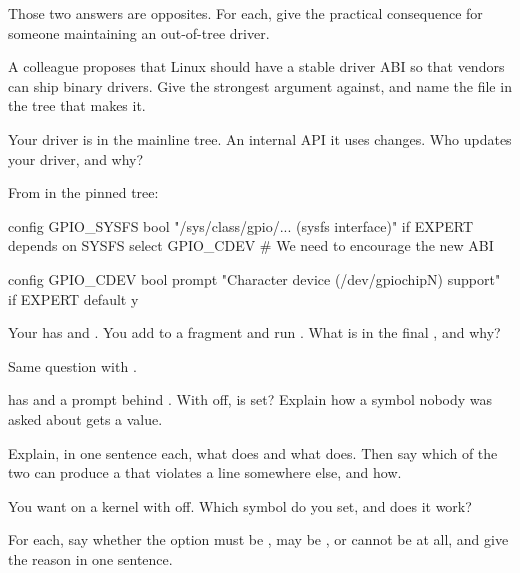  Those two answers are opposites. For each, give the practical consequence for someone
maintaining an out-of-tree driver.

 A colleague proposes that Linux should have a stable driver ABI so that vendors can ship
binary drivers. Give the strongest argument against, and name the file in the tree that makes it.

 Your driver is in the mainline tree. An internal API it uses changes. Who updates your
driver, and why?

\label{c3:ex:3}

From  in the pinned tree:

\begin{console}
config GPIO_SYSFS
	bool "/sys/class/gpio/... (sysfs interface)" if EXPERT
	depends on SYSFS
	select GPIO_CDEV # We need to encourage the new ABI

config GPIO_CDEV
	bool
	prompt "Character device (/dev/gpiochipN) support" if EXPERT
	default y
\end{console}

 Your  has  and . You
add  to a fragment and run . What is in the final
, and why?

 Same question with .

  has  and a prompt behind . With
 off, is  set? Explain how a symbol nobody was asked about gets
a value.

 Explain, in one sentence each, what  does and what  does.
Then say which of the two can produce a  that violates a  line
somewhere else, and how.

 You want  on a kernel with  off. Which symbol do you
set, and does it work?

\label{c3:ex:4}

For each, say whether the option must be , may be , or cannot be  at all,
and give the reason in one sentence.

